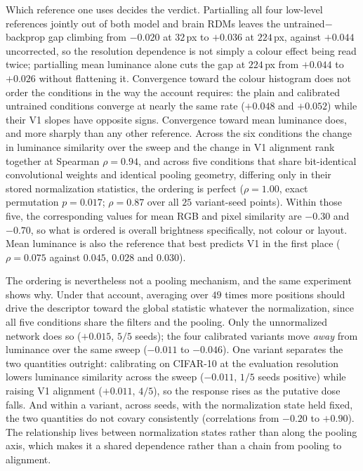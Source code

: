 \documentclass[10pt,twocolumn]{article}
\begin{document}
Which reference one uses decides the verdict. Partialling all four low-level references jointly out of both model and brain RDMs leaves the untrained$-$backprop gap climbing from $-0.020$ at $32$\,px to $+0.036$ at $224$\,px, against $+0.044$ uncorrected, so the resolution dependence is not simply a colour effect being read twice; partialling mean luminance alone cuts the gap at $224$\,px from $+0.044$ to $+0.026$ without flattening it. Convergence toward the colour histogram does not order the conditions in the way the account requires: the plain and calibrated untrained conditions converge at nearly the same rate ($+0.048$ and $+0.052$) while their V1 slopes have opposite signs. Convergence toward mean luminance does, and more sharply than any other reference. Across the six conditions the change in luminance similarity over the sweep and the change in V1 alignment rank together at Spearman $\rho = 0.94$, and across five conditions that share bit-identical convolutional weights and identical pooling geometry, differing only in their stored normalization statistics, the ordering is perfect ($\rho = 1.00$, exact permutation $p = 0.017$; $\rho = 0.87$ over all $25$ variant-seed points). Within those five, the corresponding values for mean RGB and pixel similarity are $-0.30$ and $-0.70$, so what is ordered is overall brightness specifically, not colour or layout. Mean luminance is also the reference that best predicts V1 in the first place ($\rho = 0.075$ against $0.045$, $0.028$ and $0.030$).

The ordering is nevertheless not a pooling mechanism, and the same experiment shows why. Under that account, averaging over $49$ times more positions should drive the descriptor toward the global statistic whatever the normalization, since all five conditions share the filters and the pooling. Only the unnormalized network does so ($+0.015$, $5/5$ seeds); the four calibrated variants move \emph{away} from luminance over the same sweep ($-0.011$ to $-0.046$). One variant separates the two quantities outright: calibrating on CIFAR-10 at the evaluation resolution lowers luminance similarity across the sweep ($-0.011$, $1/5$ seeds positive) while raising V1 alignment ($+0.011$, $4/5$), so the response rises as the putative dose falls. And within a variant, across seeds, with the normalization state held fixed, the two quantities do not covary consistently (correlations from $-0.20$ to $+0.90$). The relationship lives between normalization states rather than along the pooling axis, which makes it a shared dependence rather than a chain from pooling to alignment.
\end{document}
